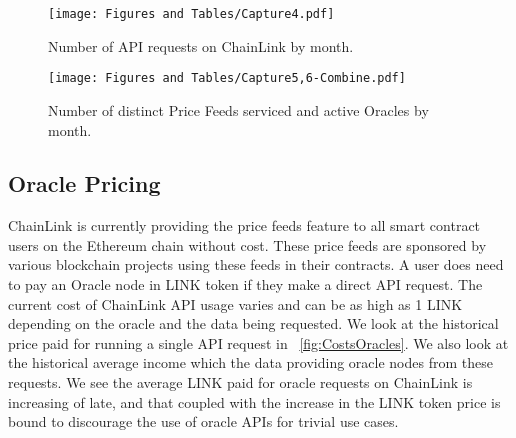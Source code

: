 \documentclass[runningheads]{llncs}
\begin{document}
\begin{figure}
\begin{center}
\texttt{[image: Figures and Tables/Capture4.pdf]}
\caption{Number of API requests on ChainLink by month.}
\label{fig:APIperMonth}
\end{center}
\end{figure}
\vspace{-5pt}
\fi

\begin{figure}
\begin{center}
\texttt{[image: Figures and Tables/Capture5,6-Combine.pdf]}
\caption{Number of distinct Price Feeds serviced and active Oracles by month.}
\label{fig:dispricefeedpermonth}
\end{center}
\end{figure}
\vspace{-5pt}

\iffalse
\begin{figure}
\begin{center}
\texttt{[image: Figures and Tables/Capture6.pdf]}
\caption{Number of distinct Oracles servicing APIs by month.}
\label{fig:disAPIpermonth}
\end{center}
\end{figure}
\vspace{-5pt}
\fi

\subsection{Oracle Pricing}
ChainLink is currently providing the price feeds feature to all smart contract users on the Ethereum chain without cost. These price feeds are sponsored by various blockchain projects using these feeds in their contracts. A user does need to pay an Oracle node in LINK token if they make a direct API request. The current cost of ChainLink API usage varies and can be as high as 1 LINK depending on the oracle and the data being requested. We look at the historical price paid for running a single API request in \figurename~\ref{fig:CostsOracles}. We also look at the historical average income which the data providing oracle nodes from these requests. We see the average LINK paid for oracle requests on ChainLink is increasing of late, and that coupled with the increase in the LINK token price is bound to discourage the use of oracle APIs for trivial use cases.
\end{document}
